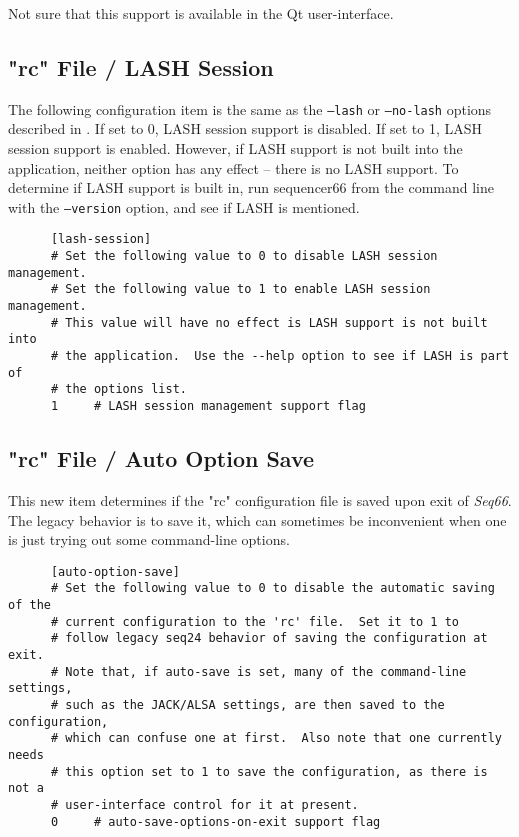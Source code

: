    Not sure that this support is available in the Qt user-interface.

\subsection{"rc" File / LASH Session}
\label{subsec:seq66_rc_file_lash_session}

   The following configuration item is the same as the
   \texttt{--lash} or \texttt{--no-lash} options described in
   .
   If set to 0, LASH session support is disabled.
   If set to 1, LASH session support is enabled.
   However, if LASH support is not built into the application, neither option
   has any effect -- there is no LASH support.  
   To determine if LASH support is built in, run sequencer66 from the command
   line with the \texttt{--version} option, and see if LASH is mentioned.

   \begin{verbatim}
      [lash-session]
      # Set the following value to 0 to disable LASH session management.
      # Set the following value to 1 to enable LASH session management.
      # This value will have no effect is LASH support is not built into
      # the application.  Use the --help option to see if LASH is part of
      # the options list.
      1     # LASH session management support flag
   \end{verbatim}

\subsection{"rc" File / Auto Option Save}
\label{subsec:seq66_rc_file_auto_rc_save}

   This new item determines if the "rc" configuration file is saved
   upon exit of \textsl{Seq66}.  The legacy behavior is to save it,
   which can sometimes be inconvenient when one is just trying out some
   command-line options.

   \begin{verbatim}
      [auto-option-save]
      # Set the following value to 0 to disable the automatic saving of the
      # current configuration to the 'rc' file.  Set it to 1 to
      # follow legacy seq24 behavior of saving the configuration at exit.
      # Note that, if auto-save is set, many of the command-line settings,
      # such as the JACK/ALSA settings, are then saved to the configuration,
      # which can confuse one at first.  Also note that one currently needs
      # this option set to 1 to save the configuration, as there is not a
      # user-interface control for it at present.
      0     # auto-save-options-on-exit support flag
   \end{verbatim}

